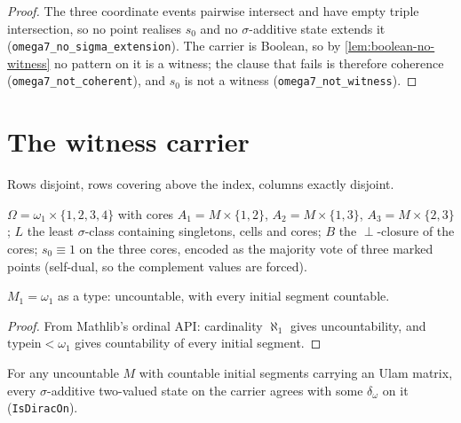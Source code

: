\begin{proof}
\leanok
The three coordinate events pairwise intersect and have empty triple
intersection, so no point realises $s_0$ and no $\sigma$-additive state extends
it (\texttt{omega7\_no\_sigma\_extension}). The carrier is Boolean, so by
\ref{lem:boolean-no-witness} no pattern on it is a witness; the clause that
fails is therefore coherence (\texttt{omega7\_not\_coherent}), and $s_0$ is not
a witness (\texttt{omega7\_not\_witness}).
\end{proof}
\section{The witness carrier}

\begin{definition}
\label{def:ulam-matrix}
\leanok
Rows disjoint, rows covering above the index, columns exactly disjoint.
\end{definition}

\begin{definition}
\label{def:core-block}
\leanok
{}
$\Omega = \omega_1 \times \{1,2,3,4\}$ with cores $A_1 = M\times\{1,2\}$,
$A_2 = M\times\{1,3\}$, $A_3 = M\times\{2,3\}$; $L$ the least $\sigma$-class
containing singletons, cells and cores; $B$ the $\perp$-closure of the cores;
$s_0 \equiv 1$ on the three cores, encoded as the majority vote of three marked
points (self-dual, so the complement values are forced).
\end{definition}

\begin{lemma}
\label{lem:omega1}
\leanok
$M_1 = \omega_1$ as a type: uncountable, with every initial segment countable.
\end{lemma}

\begin{proof}
\leanok
From Mathlib's ordinal API: cardinality $\aleph_1$ gives uncountability, and $\mathrm{typein} < \omega_1$ gives countability of every initial segment.
\end{proof}

\begin{theorem}
\label{thm:rigidity}
\leanok
{}
For any uncountable $M$ with countable initial segments carrying an Ulam matrix,
every $\sigma$-additive two-valued state on the carrier agrees with some
$\delta_\omega$ on it (\texttt{IsDiracOn}).
\end{theorem}

